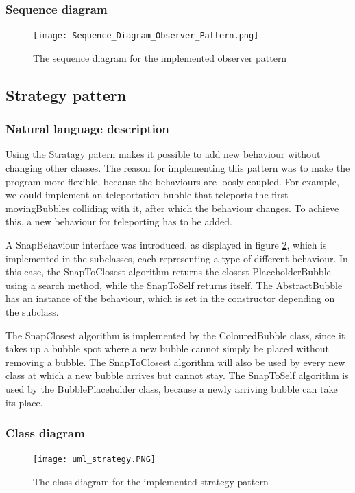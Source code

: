 \documentclass[a4paper]{article}
\begin{document}
\subsubsection{Sequence diagram}
\begin{figure}[H]
    \texttt{[image: Sequence\_Diagram\_Observer\_Pattern.png]}
    \caption{\label{fig:sequence_observer} The sequence diagram for the implemented observer pattern}
\end{figure}

\subsection{Strategy pattern}

\subsubsection{Natural language description}

Using the Stratagy patern makes it possible to add new behaviour without changing other classes. The reason for implementing this pattern was to make the program more flexible, because the behaviours are loosly coupled. For example, we could implement an teleportation bubble that teleports the first movingBubbles colliding with it, after which the behaviour changes. To achieve this, a new behaviour for teleporting has to be added.

A SnapBehaviour interface was introduced, as displayed in figure \ref{fig:class_strategy}, which is implemented in the subclasses, each representing a type of different behaviour. In this case, the SnapToClosest algorithm returns the closest PlaceholderBubble using a search method, while the SnapToSelf returns itself. The AbstractBubble has an instance of the behaviour, which is set in the constructor depending on the subclass.

The SnapClosest algorithm is implemented by the ColouredBubble class, since it takes up a bubble spot where a new bubble cannot simply be placed without removing a bubble. The SnapToClosest algorithm will also be used by every new class at which a new bubble arrives but cannot stay. The SnapToSelf algorithm is used by the BubblePlaceholder class, because a newly arriving bubble can take its place.

\subsubsection{Class diagram}
\begin{figure}[H]
    \texttt{[image: uml\_strategy.PNG]}
    \caption{\label{fig:class_strategy} The class diagram for the implemented strategy pattern}
\end{figure}
\end{document}
